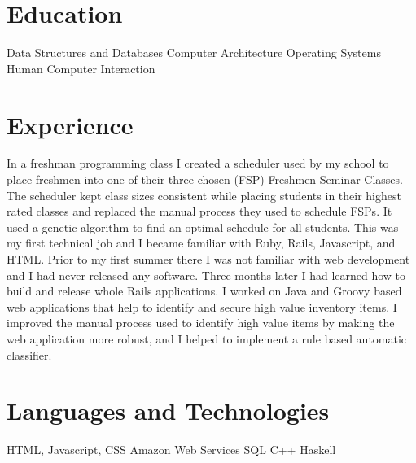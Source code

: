 \documentclass[11pt,a4paper,sans]{moderncv}
\begin{document}
\makecvtitle
\section{Education}
                 {Data Structures and Databases}
 {Computer Architecture}
                  {Operating Systems}
           {Human Computer Interaction}

\section{Experience}
{
  In a freshman programming class I created a scheduler used by my
  school to place freshmen into one of their three chosen (FSP) Freshmen
  Seminar Classes.
  The scheduler kept class sizes consistent while placing students in
  their highest rated classes and replaced the manual process they used to
  schedule FSPs. It used a genetic algorithm to find an optimal schedule
  for all students.
}
{
  This was my first technical job and I became familiar with Ruby, Rails,
  Javascript, and HTML. Prior to my first summer there I was not familiar
  with web development and I had never released any software. Three months
  later I had learned how to build and release whole Rails applications.
}
{
  I worked on Java and Groovy based web applications that help to identify
  and secure high value inventory items. I improved the manual process used
  to identify high value items by making the web application more robust,
  and I helped to implement a rule based automatic classifier.
}

\section{Languages and Technologies}
 {HTML, Javascript, CSS}
 {Amazon Web Services}
 {SQL}
 {C++}
 {Haskell}
\end{document}
